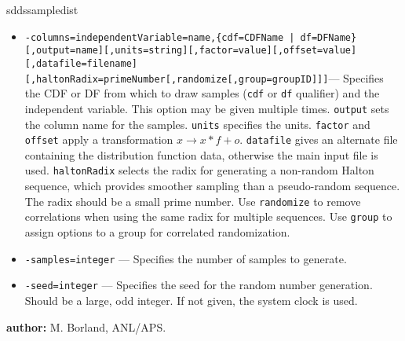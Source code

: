 \begin{sddsprog}{sddssampledist}
\begin{itemize}
      \item \verb!-columns=independentVariable=name,{cdf=CDFName | df=DFName}[,output=name][,units=string][,factor=value][,offset=value][,datafile=filename][,haltonRadix=primeNumber[,randomize[,group=groupID]]]!--- Specifies the CDF or DF from which to draw samples (\verb|cdf| or \verb|df| qualifier) and the independent variable. This option may be given multiple times. \verb|output| sets the column name for the samples. \verb|units| specifies the units. \verb|factor| and \verb|offset| apply a transformation $x \rightarrow x*f+o$. \verb|datafile| gives an alternate file containing the distribution function data, otherwise the main input file is used. \verb|haltonRadix| selects the radix for generating a non-random Halton sequence, which provides smoother sampling than a pseudo-random sequence. The radix should be a small prime number. Use \verb|randomize| to remove correlations when using the same radix for multiple sequences. Use \verb|group| to assign options to a group for correlated randomization.
      \item \verb|-samples=integer| --- Specifies the number of samples to generate.
      \item \verb|-seed=integer| --- Specifies the seed for the random number generation. Should be a large, odd integer. If not given, the system clock is used.
    \end{itemize}
  \item \textbf{author:} M. Borland, ANL/APS.
\end{sddsprog}


